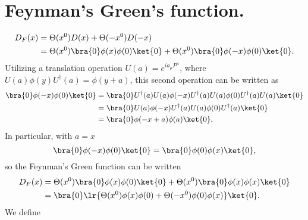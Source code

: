 %
%
\section{Feynman's Green's function.}
\begin{equation}\label{eqn:qftLecture13:280}
\begin{aligned}
D_F(x)
&=
\Theta(x^0) D(x) +
\Theta(-x^0) D(-x)
\\&=
\Theta(x^0) \bra{0} \phi(x) \phi(0) \ket{0}
+\Theta(x^0) \bra{0} \phi(-x) \phi(0) \ket{0}.
\end{aligned}
\end{equation}
Utilizing a translation operation \( U(a) = e^{i a_\mu P^\mu } \), where \( U(a) \phi(y) U^\dagger(a) = \phi(y + a) \), this second operation can be written as
\begin{equation}\label{eqn:qftLecture13:300}
\begin{aligned}
\bra{0} \phi(-x) \phi(0) \ket{0}
&=
\bra{0} U^\dagger(a) U(a) \phi(-x) U^\dagger(a) U(a) \phi(0) U^\dagger(a) U(a) \ket{0}
\\&=
\bra{0} U(a) \phi(-x) U^\dagger(a) U(a) \phi(0) U^\dagger(a) \ket{0}
\\&=
\bra{0} \phi(-x + a) \phi(a) \ket{0},
\end{aligned}
\end{equation}
In particular, with \( a = x \)
\begin{equation}\label{eqn:qftLecture13:320}
\bra{0} \phi(-x) \phi(0) \ket{0} = \bra{0} \phi(0) \phi(x) \ket{0},
\end{equation}
so the Feynman's Green function can be written
\begin{equation}\label{eqn:qftLecture13:340}
\begin{aligned}
D_F(x)
&=
\Theta(x^0) \bra{0} \phi(x) \phi(0) \ket{0}
+\Theta(x^0) \bra{0} \phi(x) \phi(x) \ket{0}
\\&=
\bra{0}
\lr{
\Theta(x^0)
\phi(x) \phi(0)
+
\Theta(-x^0)
\phi(0) \phi(x)
}
\ket{0}.
\end{aligned}
\end{equation}
We define

